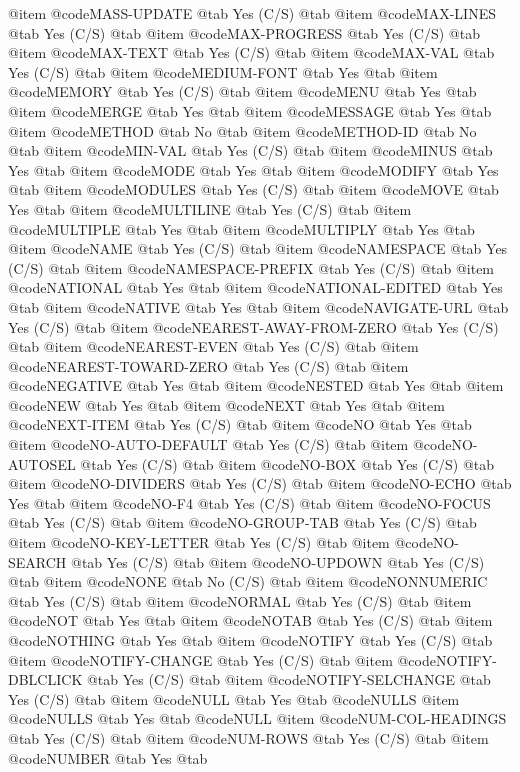 @item @code{MASS-UPDATE} @tab Yes	(C/S) @tab 
@item @code{MAX-LINES} @tab Yes	(C/S) @tab 
@item @code{MAX-PROGRESS} @tab Yes	(C/S) @tab 
@item @code{MAX-TEXT} @tab Yes	(C/S) @tab 
@item @code{MAX-VAL} @tab Yes	(C/S) @tab 
@item @code{MEDIUM-FONT} @tab Yes @tab 
@item @code{MEMORY} @tab Yes	(C/S) @tab 
@item @code{MENU} @tab Yes @tab 
@item @code{MERGE} @tab Yes @tab 
@item @code{MESSAGE} @tab Yes @tab 
@item @code{METHOD} @tab No @tab 
@item @code{METHOD-ID} @tab No @tab 
@item @code{MIN-VAL} @tab Yes	(C/S) @tab 
@item @code{MINUS} @tab Yes @tab 
@item @code{MODE} @tab Yes @tab 
@item @code{MODIFY} @tab Yes @tab 
@item @code{MODULES} @tab Yes	(C/S) @tab 
@item @code{MOVE} @tab Yes @tab 
@item @code{MULTILINE} @tab Yes	(C/S) @tab 
@item @code{MULTIPLE} @tab Yes @tab 
@item @code{MULTIPLY} @tab Yes @tab 
@item @code{NAME} @tab Yes	(C/S) @tab 
@item @code{NAMESPACE} @tab Yes	(C/S) @tab 
@item @code{NAMESPACE-PREFIX} @tab Yes	(C/S) @tab 
@item @code{NATIONAL} @tab Yes @tab 
@item @code{NATIONAL-EDITED} @tab Yes @tab 
@item @code{NATIVE} @tab Yes @tab 
@item @code{NAVIGATE-URL} @tab Yes	(C/S) @tab 
@item @code{NEAREST-AWAY-FROM-ZERO} @tab Yes	(C/S) @tab 
@item @code{NEAREST-EVEN} @tab Yes	(C/S) @tab 
@item @code{NEAREST-TOWARD-ZERO} @tab Yes	(C/S) @tab 
@item @code{NEGATIVE} @tab Yes @tab 
@item @code{NESTED} @tab Yes @tab 
@item @code{NEW} @tab Yes @tab 
@item @code{NEXT} @tab Yes @tab 
@item @code{NEXT-ITEM} @tab Yes	(C/S) @tab 
@item @code{NO} @tab Yes @tab 
@item @code{NO-AUTO-DEFAULT} @tab Yes	(C/S) @tab 
@item @code{NO-AUTOSEL} @tab Yes	(C/S) @tab 
@item @code{NO-BOX} @tab Yes	(C/S) @tab 
@item @code{NO-DIVIDERS} @tab Yes	(C/S) @tab 
@item @code{NO-ECHO} @tab Yes @tab 
@item @code{NO-F4} @tab Yes	(C/S) @tab 
@item @code{NO-FOCUS} @tab Yes	(C/S) @tab 
@item @code{NO-GROUP-TAB} @tab Yes	(C/S) @tab 
@item @code{NO-KEY-LETTER} @tab Yes	(C/S) @tab 
@item @code{NO-SEARCH} @tab Yes	(C/S) @tab 
@item @code{NO-UPDOWN} @tab Yes	(C/S) @tab 
@item @code{NONE} @tab No	(C/S) @tab 
@item @code{NONNUMERIC} @tab Yes	(C/S) @tab 
@item @code{NORMAL} @tab Yes	(C/S) @tab 
@item @code{NOT} @tab Yes @tab 
@item @code{NOTAB} @tab Yes	(C/S) @tab 
@item @code{NOTHING} @tab Yes @tab 
@item @code{NOTIFY} @tab Yes	(C/S) @tab 
@item @code{NOTIFY-CHANGE} @tab Yes	(C/S) @tab 
@item @code{NOTIFY-DBLCLICK} @tab Yes	(C/S) @tab 
@item @code{NOTIFY-SELCHANGE} @tab Yes	(C/S) @tab 
@item @code{NULL} @tab Yes @tab @code{NULLS}
@item @code{NULLS} @tab Yes @tab @code{NULL}
@item @code{NUM-COL-HEADINGS} @tab Yes	(C/S) @tab 
@item @code{NUM-ROWS} @tab Yes	(C/S) @tab 
@item @code{NUMBER} @tab Yes @tab 
